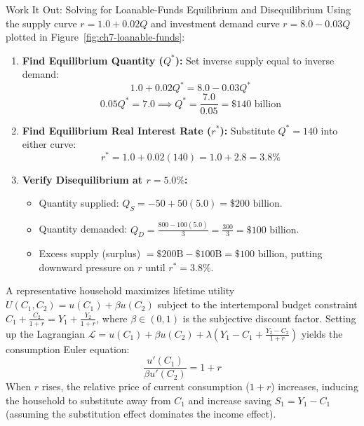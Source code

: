 \documentclass[11pt,letterpaper]{article}
\begin{document}
\begin{examplecase}{Work It Out: Solving for Loanable-Funds Equilibrium and Disequilibrium}
Using the supply curve $r = 1.0 + 0.02Q$ and investment demand curve $r = 8.0 - 0.03Q$ plotted in Figure~\ref{fig:ch7-loanable-funds}:
\begin{enumerate}
  \item \textbf{Find Equilibrium Quantity ($Q^*$):} Set inverse supply equal to inverse demand:
  $$1.0 + 0.02Q^* = 8.0 - 0.03Q^*$$
  $$0.05Q^* = 7.0 \implies Q^* = \frac{7.0}{0.05} = \$140\text{ billion}$$
  \item \textbf{Find Equilibrium Real Interest Rate ($r^*$):} Substitute $Q^* = 140$ into either curve:
  $$r^* = 1.0 + 0.02(140) = 1.0 + 2.8 = 3.8\%$$
  \item \textbf{Verify Disequilibrium at $r = 5.0\%$:}
  \begin{itemize}[noitemsep]
    \item Quantity supplied: $Q_S = -50 + 50(5.0) = \$200\text{ billion}$.
    \item Quantity demanded: $Q_D = \frac{800 - 100(5.0)}{3} = \frac{300}{3} = \$100\text{ billion}$.
    \item Excess supply (surplus) $= \$200\text{B} - \$100\text{B} = \$100\text{ billion}$, putting downward pressure on $r$ until $r^* = 3.8\%$.
  \end{itemize}
\end{enumerate}
\end{examplecase}

\begin{coreprinciple}
A representative household maximizes lifetime utility $U(C_1, C_2) = u(C_1) + \beta u(C_2)$ subject to the intertemporal budget constraint $C_1 + \frac{C_2}{1+r} = Y_1 + \frac{Y_2}{1+r}$, where $\beta \in (0,1)$ is the subjective discount factor. Setting up the Lagrangian $\mathcal{L} = u(C_1) + \beta u(C_2) + \lambda\left(Y_1 - C_1 + \frac{Y_2 - C_2}{1+r}\right)$ yields the consumption Euler equation:
$$\frac{u'(C_1)}{\beta u'(C_2)} = 1 + r$$
When $r$ rises, the relative price of current consumption ($1+r$) increases, inducing the household to substitute away from $C_1$ and increase saving $S_1 = Y_1 - C_1$ (assuming the substitution effect dominates the income effect).
\end{coreprinciple}

\end{document}
